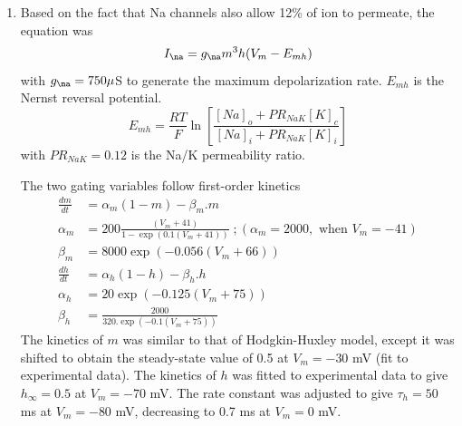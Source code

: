 \begin{enumerate}


\item Based on the fact that Na channels also allow 12\% of  ion to
permeate, the equation was
  \begin{equation}
    \label{eq:713}
      I_{\na} =g_{\na} m^3h (V_m-E_{mh}) 
  \end{equation}
  with $g_{\na}=750\mu$S to generate the maximum depolarization rate.
  $E_{mh}$ is the Nernst reversal potential.
  \begin{equation}
    \label{eq:748}
    E_{mh} = \frac{RT}{F} \ln\left[\frac{[Na]_o+PR_{NaK}[K]_c}{[Na]_i+PR_{NaK}[K]_i}\right]
  \end{equation}
  with $PR_{NaK}=0.12$ is the Na/K permeability ratio. 

  The two gating variables follow first-order kinetics
  \begin{equation}
    \label{eq:714}
    \begin{split}
      \frac{dm}{dt} &= \alpha_m(1-m)-\beta_m.m \\
      \alpha_m &= 200\frac{(V_m+41)}{1-\exp(0.1(V_m+41))}\;;
      (\alpha_m = 2000, \text{ when } V_m=-41) \\
      \beta_m &= 8000\exp(-0.056(V_m+66)) \\
      \frac{dh}{dt} &= \alpha_h(1-h)-\beta_h.h \\
      \alpha_h &= 20\exp(-0.125(V_m+75)) \\
      \beta_h &= \frac{2000}{320.\exp(-0.1(V_m+75))}
    \end{split}
  \end{equation}
  The kinetics of $m$ was similar to that of Hodgkin-Huxley model,
  except it was shifted to obtain the steady-state value of 0.5 at
  $V_m=-30$ mV (fit to experimental data). The kinetics of $h$ was
  fitted to experimental data to give $h_\infty=0.5$ at $V_m=-70$
  mV. The rate constant was adjusted to give  $\tau_h=50$ ms at
  $V_m=-80$ mV, decreasing to 0.7 ms at $V_m=0$ mV. 


\end{enumerate}
